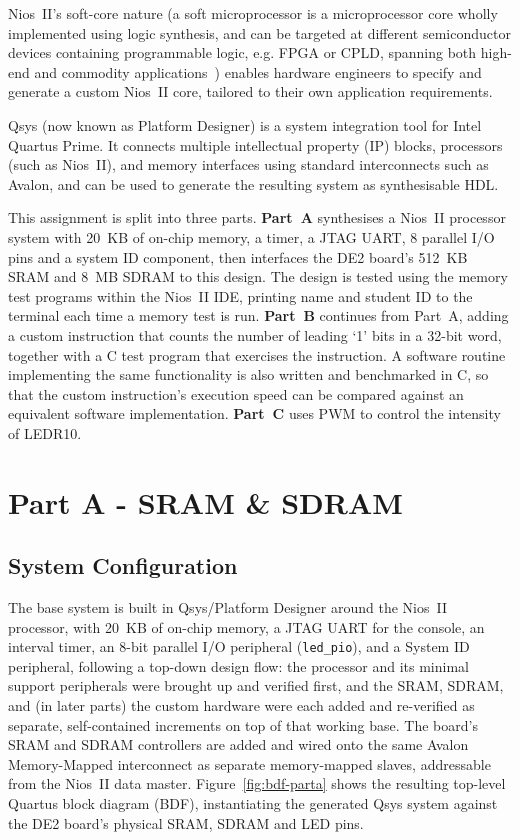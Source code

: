\documentclass[
    12pt,
    a4paper
]{report}
\begin{document}
Nios~II's soft-core nature (a soft microprocessor is a microprocessor core wholly implemented
using logic synthesis, and can be targeted at different semiconductor devices containing
programmable logic, e.g. FPGA or CPLD, spanning both high-end and commodity
applications~\cite{soft-microprocessor}) enables hardware engineers to specify and generate a
custom Nios~II core, tailored to their own application requirements.

Qsys (now known as Platform Designer) is a system integration tool for Intel Quartus Prime. It
connects multiple intellectual property (IP) blocks, processors (such as Nios~II), and memory
interfaces using standard interconnects such as Avalon, and can be used to generate the resulting
system as synthesisable HDL.

This assignment is split into three parts. \textbf{Part~A} synthesises a Nios~II processor system
with 20~KB of on-chip memory, a timer, a JTAG UART, 8 parallel I/O pins and a system ID component,
then interfaces the DE2 board's 512~KB SRAM and 8~MB SDRAM to this design. The design is tested
using the memory test programs within the Nios~II IDE, printing name and student ID to the
terminal each time a memory test is run. \textbf{Part~B} continues from Part~A, adding a custom
instruction that counts the number of leading `1' bits in a 32-bit word, together with a C test
program that exercises the instruction. A software routine implementing the same functionality is
also written and benchmarked in C, so that the custom instruction's execution speed can be
compared against an equivalent software implementation. \textbf{Part~C} uses PWM to control the
intensity of LEDR10.


\chapter{Part A - SRAM \& SDRAM}

\section{System Configuration}

The base system is built in Qsys/Platform Designer around the Nios~II processor, with 20~KB of
on-chip memory, a JTAG UART for the console, an interval timer, an 8-bit parallel I/O peripheral
(\texttt{led\_pio}), and a System ID peripheral, following a top-down design flow: the processor
and its minimal support peripherals were brought up and verified first, and the SRAM, SDRAM, and
(in later parts) the custom hardware were each added and re-verified as separate, self-contained
increments on top of that working base. The board's SRAM and SDRAM controllers are added and wired
onto the same Avalon Memory-Mapped interconnect as separate memory-mapped slaves, addressable from
the Nios~II data master. Figure~\ref{fig:bdf-parta} shows the resulting top-level Quartus block
diagram (BDF), instantiating the generated Qsys system against the DE2 board's physical SRAM,
SDRAM and LED pins.
\end{document}
